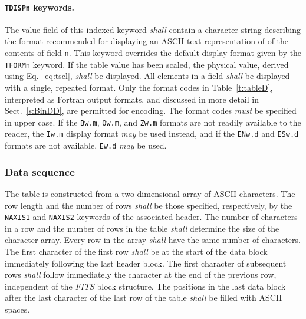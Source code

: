 \documentclass[onecolumn]{aa}
\begin{document}
   \paragraph{{\tt TDISPn} keywords.}  The value field of this
 indexed keyword {\em shall} contain a character string
 describing the format recommended for displaying an ASCII text
 representation of of the contents
 of field {\tt n}.  This keyword overrides the default display format
 given by the {\tt TFORMn} keyword. 
 If the table value has been scaled, the
 physical value, derived using Eq.~\ref{eq:tscl}, {\em shall} be
 displayed.  All elements in a field                                         
 {\em shall} be displayed with a single, repeated format.  Only the format codes in 
 Table~\ref{t:tableD}, interpreted as Fortran \citep{iso04} 
 output formats, and
 discussed in more detail in Sect.\ \ref{s:BinDD}, 
 are permitted for encoding. The format codes {\em must} be specified in upper case.
 If the {\tt Bw.m}, {\tt Ow.m}, and {\tt Zw.m} formats are 
 not readily available to the reader, the {\tt Iw.m} display format {\em may} be used 
 instead, and if the {\tt ENw.d} and {\tt ESw.d} formats are not available, 
 {\tt Ew.d} {\em may} 
 be used.


\subsubsection{Data sequence}
   The table is constructed from a two-dimensional array of 
   ASCII characters. 
   The row length and the number of rows {\em shall} be those specified, 
   respectively, by the {\tt NAXIS1} 
   and {\tt NAXIS2} keywords
   of the associated header.  The
   number of characters in a row and the number of rows in the
   table {\em shall} determine the size of the character array.  Every row
   in the array {\em shall} have the same number of characters.  The
   first character of the first row {\em shall} be at the start of the data block
   immediately following the last header block.  The first
   character of subsequent rows {\em shall} follow immediately the
   character at the end of the previous row,
   independent of the {\em FITS\/} block structure.  The positions in the last
   data block after the last character of the last row of the table
   {\em shall} be filled with ASCII spaces.
  
\end{document}
